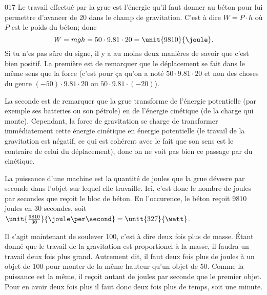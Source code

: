 \documentclass{article}
\begin{document}
\begin{corrige}{017}
Le travail effectué par la grue est l'énergie qu'il faut donner au béton pour lui permettre d'avancer de \unit{20}{\meter} dans le champ de gravitation. C'est à dire $W=P\cdot h$ où $P$ est le poids du béton; donc
\[ 
  W=mgh=50\cdot 9.81\cdot 20=\unit{9810}{\joule}.
\]
Si tu n'es pas sûre du signe, il y a au moins deux manières de savoir que c'est bien positif. La première est de remarquer que le déplacement se fait dans le même sens que la force (c'est pour ça qu'on a noté $50\cdot 9.81\cdot 20$ et non des choses du genre $(-50)\cdot 9.81\cdot 20$ ou $50\cdot9.81\cdot (-20)$).

La seconde est de remarquer que la grue transforme de l'énergie potentielle (par exemple ses batteries ou son pétrole) en de l'énergie cinétique (de la charge qui monte). Cependant, la force de gravitation se charge de transformer immédiatement cette énergie cinétique en énergie potentielle (le travail de la gravitation est négatif, ce qui est cohérent avec le fait que son sens est le contraire de celui du déplacement), donc on ne \og voit\fg{} pas bien ce passage par du cinétique.

La puissance d'une machine est la quantité de joules que la grue dévesre par seconde dans l'objet sur lequel elle travaille. Ici, c'est donc le nombre de joules par secondes que reçoit le bloc de béton. En l'occurence, le béton reçoit $9810$ joules en $30$ secondes, soit $\unit{\frac{9810 }{ 30 }}{\joule\per\second}=\unit{327}{\watt}$.

Il s'agit maintenant de soulever \unit{100}{\kilogram}, c'est à dire deux fois plus de masse. Étant donné que le travail de la gravitation est proportionel à la masse, il faudra un travail deux fois plus grand. Autrement dit, il faut deux fois plus de joules à un objet de \unit{100}{\kilogram} pour monter de la même hauteur qu'un objet de \unit{50}{\kilogram}. Comme la puissance est la même, il reçoit autant de joules par seconde que le premier objet. Pour en avoir deux fois plus il faut donc deux fois plus de temps, soit une minute.

\end{corrige}
\end{document}
